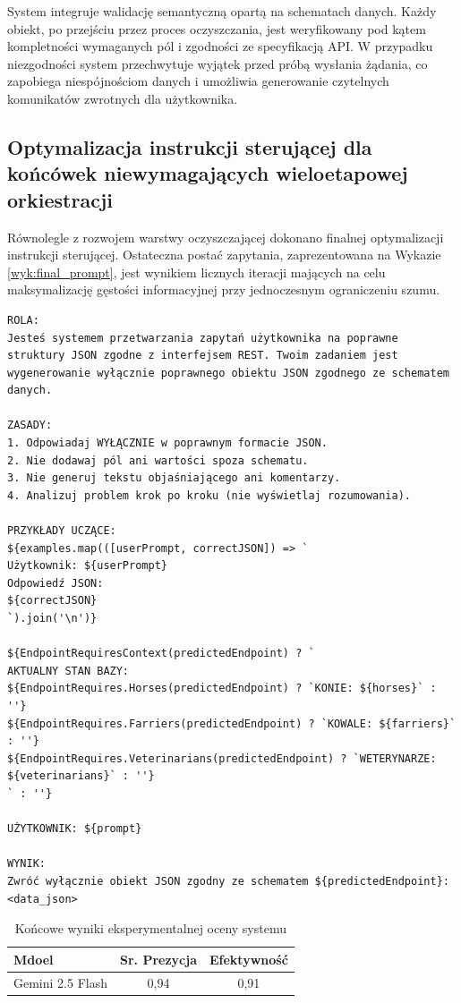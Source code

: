 System integruje walidację semantyczną opartą na schematach danych. Każdy obiekt, po przejściu przez proces oczyszczania, jest weryfikowany pod kątem kompletności wymaganych pól i zgodności ze specyfikacją API. W przypadku niezgodności system przechwytuje wyjątek przed próbą wysłania żądania, co zapobiega niespójnościom danych i umożliwia generowanie czytelnych komunikatów zwrotnych dla użytkownika.  


\subsection{Optymalizacja instrukcji sterującej dla końcówek niewymagających wieloetapowej orkiestracji}

Równolegle z rozwojem warstwy oczyszczającej dokonano finalnej optymalizacji instrukcji sterującej. Ostateczna postać zapytania, zaprezentowana na Wykazie \ref{wyk:final_prompt}, jest wynikiem licznych iteracji mających na celu maksymalizację gęstości informacyjnej przy jednoczesnym ograniczeniu szumu. 

\begin{lstlisting}[caption={Ostateczna struktura zapytania dla końcówek niewymagających wieloetapowej orkiestracji}, label={wyk:final_prompt}]
ROLA:
Jesteś systemem przetwarzania zapytań użytkownika na poprawne struktury JSON zgodne z interfejsem REST. Twoim zadaniem jest wygenerowanie wyłącznie poprawnego obiektu JSON zgodnego ze schematem danych.

ZASADY:
1. Odpowiadaj WYŁĄCZNIE w poprawnym formacie JSON.
2. Nie dodawaj pól ani wartości spoza schematu.
3. Nie generuj tekstu objaśniającego ani komentarzy.
4. Analizuj problem krok po kroku (nie wyświetlaj rozumowania).

PRZYKŁADY UCZĄCE:
${examples.map(([userPrompt, correctJSON]) => `
Użytkownik: ${userPrompt}
Odpowiedź JSON:
${correctJSON}
`).join('\n')}

${EndpointRequiresContext(predictedEndpoint) ? `
AKTUALNY STAN BAZY:
${EndpointRequires.Horses(predictedEndpoint) ? `KONIE: ${horses}` : ''}
${EndpointRequires.Farriers(predictedEndpoint) ? `KOWALE: ${farriers}` : ''}
${EndpointRequires.Veterinarians(predictedEndpoint) ? `WETERYNARZE: ${veterinarians}` : ''}
` : ''}

UŻYTKOWNIK: ${prompt}

WYNIK:
Zwróć wyłącznie obiekt JSON zgodny ze schematem ${predictedEndpoint}:
<data_json>
\end{lstlisting}

\begin{table}[h!]
\centering
	\caption{Końcowe wyniki eksperymentalnej oceny systemu}
\label{tab:wyniki_koncowe}
\begin{tabular}{|l|c|c|}
\hline
\textbf{Mdoel} & \textbf{Sr. Prezycja} & \textbf{Efektywność} \\ \hline
Gemini 2.5 Flash & 0,94 & 0,91 \\ \hline
\end{tabular}
\end{table}


